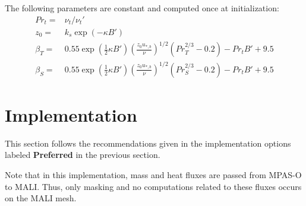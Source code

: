 \documentclass[11pt]{report}
\newcommand{\bea}{\begin{eqnarray}}
\newcommand{\eea}{\end{eqnarray}}
\begin{document}
The following parameters are constant and computed once at initialization:
\bea
    Pr_t =& \nu_t / \nu_t'\\
    z_0 =& k_s \exp{(-\kappa B')}\\
    \beta_T =& 0.55 \exp{(\frac{1}{2}\kappa B')}(\frac{z_0 u_{*,b}}{\nu})^{1/2}(Pr_T^{2/3} - 0.2) - Pr_t B' + 9.5\\
    \beta_S =& 0.55 \exp{(\frac{1}{2}\kappa B')}(\frac{z_0 u_{*,b}}{\nu})^{1/2}(Pr_S^{2/3} - 0.2) - Pr_t B' + 9.5
\eea

\section{Implementation}

This section follows the recommendations given in the implementation options labeled \textbf{Preferred} in the previous section.

Note that in this implementation, mass and heat fluxes are passed from MPAS-O to MALI. Thus, only masking and no computations related to these fluxes occurs on the MALI mesh.
\end{document}
